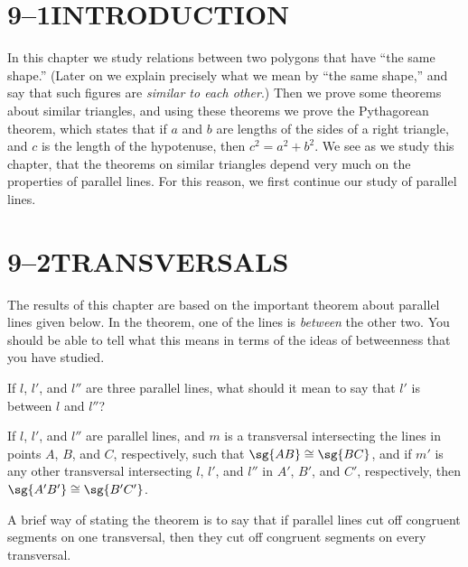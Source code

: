 \documentclass[11pt]{book}
\theoremstyle{bkplain}
\theoremstyle{XIplainnote}
\theoremstyle{bkplain}
\theoremstyle{bkplain}
\begin{document}
\section*{9--1\quad INTRODUCTION}

In this chapter we study relations between two polygons that have ``the same
shape.'' (Later on we explain precisely what we mean by ``the same shape,'' and
say that such figures are \emph{similar to each other}.) Then we prove some
theorems about similar triangles, and using these theorems we prove the
Pythagorean theorem, which states that if $a$ and $b$ are lengths of the sides of
a right triangle, and $c$ is the length of the hypotenuse, then $c^2 = a^2 + b^2$.
We see as we study this chapter, that the theorems on similar triangles depend
very much on the properties of parallel lines. For this reason, we first continue
our study of parallel lines.

\section*{9--2\quad TRANSVERSALS}

The results of this chapter are based on the important theorem about parallel
lines given below. In the theorem, one of the lines is \emph{between} the other
two. You should be able to tell what this means in terms of the ideas of
betweenness that you have studied.

If $l$, $l'$, and $l''$ are three parallel lines, what should it mean to say that
$l'$ is between $l$ and $l''$?

\begin{theorem}
If $l$, $l'$, and $l''$ are parallel lines, and $m$ is a transversal intersecting
the lines in points $A$, $B$, and $C$, respectively, such that
$\sg{AB} \cong \sg{BC}$, and if $m'$ is any other transversal intersecting $l$,
$l'$, and $l''$ in $A'$, $B'$, and $C'$, respectively, then
$\sg{A'B'} \cong \sg{B'C'}$.
\end{theorem}

\begin{remark}
A brief way of stating the theorem is to say that if parallel lines cut off
congruent segments on one transversal, then they cut off congruent segments on
every transversal.
\end{remark}
\end{document}
